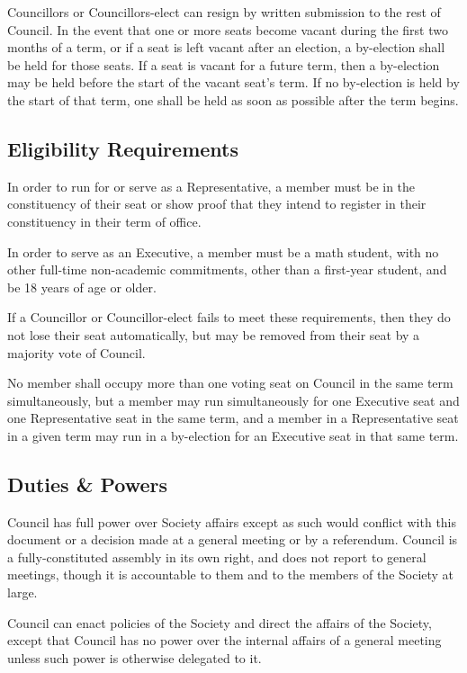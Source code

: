 Councillors or Councillors-elect can resign by written submission to the rest of
Council. In the event that one or more seats become vacant during the first two
months of a term, or if a seat is left vacant after an election, a by-election
shall be held for those seats. If a seat is vacant for a future term, then a
by-election may be held before the start of the vacant seat’s term. If no
by-election is held by the start of that term, one shall be held as soon as
possible after the term begins.

\subsection{Eligibility Requirements}
In order to run for or serve as a Representative, a member must be in the
constituency of their seat or show proof that they intend to register in their
constituency in their term of office.

In order to serve as an Executive, a member must be a math student, with no
other full-time non-academic commitments, other than a first-year student, and
be 18 years of age or older.

If a Councillor or Councillor-elect fails to meet these requirements, then they
do not lose their seat automatically, but may be removed from their seat by a
majority vote of Council.

No member shall occupy more than one voting seat on Council in the same term
simultaneously, but a member may run simultaneously for one Executive seat and
one Representative seat in the same term, and a member in a Representative seat in
a given term may run in a by-election for an Executive seat in that same term.

\subsection{Duties \& Powers}
Council has full power over Society affairs except as such would conflict with
this document or a decision made at a general meeting or by a referendum.
Council is a fully-constituted assembly in its own right, and does not report to
general meetings, though it is accountable to them and to the members of the
Society at large.

Council can enact policies of the Society and direct the affairs of the Society,
except that Council has no power over the internal affairs of a general meeting
unless such power is otherwise delegated to it.

